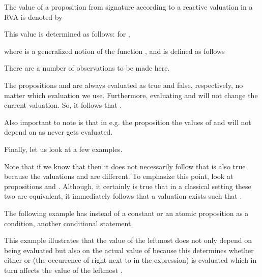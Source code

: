 \documentclass[a4paper,twoside,openright]{report}
\begin{document}
The value of a proposition  from signature  according to a reactive valuation  in a RVA  is denoted by

This value is determined as follows: for ,

where  is a generalized notion of the function , and is defined as follows

There are a number of observations to be made here.

The propositions  and  are always evaluated as true and false, respectively, no matter which evaluation we use. Furthermore, evaluating  and  will not change the current valuation. So, it follows that .

Also important to note is that in e.g. the proposition  the values of  and  will not depend on  as  never gets evaluated.

Finally, let us look at a few examples.

Note that if we know that  then it does not necessarily follow that  is also true because the valuations  and  are different. To emphasize this point, look at propositions  and . Although, it certainly is true that in a classical setting these two are equivalent, it immediately follows that a valuation  exists such that .

The following example has instead of a constant or an atomic proposition as a condition, another conditional statement.

This example illustrates that the value of the leftmost  does not only depend on  being evaluated but also on the actual value of  because this determines whether either  or  (the occurrence of  right next to  in the expression) is evaluated which in turn affects the value of the leftmost .
\end{document}
